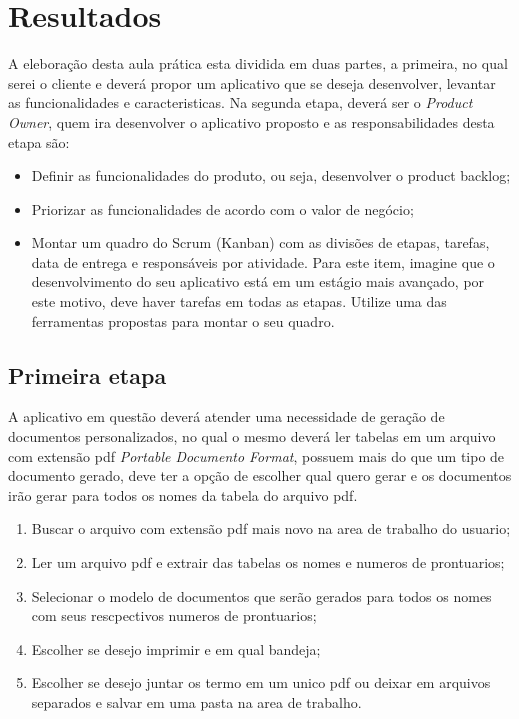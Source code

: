 \section{Resultados}
\par A eleboração desta aula prática esta dividida em duas partes, a primeira, no qual serei o cliente e deverá propor um aplicativo que se deseja desenvolver, levantar as funcionalidades e caracteristicas. Na segunda etapa, deverá ser o \textit{Product Owner}, quem ira desenvolver o aplicativo proposto e as responsabilidades desta etapa são:
\begin{itemize}
  \item Definir as funcionalidades do produto, ou seja, desenvolver o product backlog;
  \item Priorizar as funcionalidades de acordo com o valor de negócio;
  \item Montar um quadro do Scrum (Kanban) com as divisões de etapas, tarefas, data de entrega e responsáveis por atividade. Para este item, imagine que o desenvolvimento do seu aplicativo está em um estágio mais avançado, por este motivo, deve haver tarefas em todas as etapas. Utilize uma das ferramentas propostas para montar o seu quadro.
\end{itemize}

\subsection{Primeira etapa}
\par A aplicativo em questão deverá atender uma necessidade de geração de documentos personalizados, no qual o mesmo deverá ler tabelas em um arquivo com extensão pdf \textit{Portable Documento Format}, possuem mais do que um tipo de documento gerado, deve ter a opção de escolher qual quero gerar e os documentos irão gerar para todos os nomes da tabela do arquivo pdf.
\begin{enumerate}
  \item Buscar o arquivo com extensão pdf mais novo na area de trabalho do usuario;
  \item Ler um arquivo pdf e extrair das tabelas os nomes e numeros de prontuarios;
  \item Selecionar o modelo de documentos que serão gerados para todos os nomes com seus rescpectivos numeros de prontuarios;
  \item Escolher se desejo imprimir e em qual bandeja;
  \item Escolher se desejo juntar os termo em um unico pdf ou deixar em arquivos separados e salvar em uma pasta na area de trabalho.

\end{enumerate}

